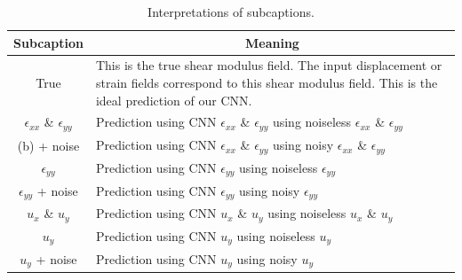 \documentclass[12pt]{article}
\begin{document}
\begin{table}
  \centering
   \begin{tabular}{cp{8cm}}
    \hline
    \multicolumn{1}{|c|}{Subcaption} & \multicolumn{1}{c|}{Meaning}\\
    \hline
    \multicolumn{1}{|c|}{True} & \multicolumn{1}{p{8cm}|}{This is the true shear modulus field. The input displacement or strain fields correspond to this shear modulus field. This is the ideal prediction of our CNN.}\\
    \hline
    \multicolumn{1}{|c|}{$\epsilon_{xx}$ \& $\epsilon_{yy}$} & \multicolumn{1}{p{8cm}|}{Prediction using CNN $\epsilon_{xx}$ \& $\epsilon_{yy}$ using noiseless $\epsilon_{xx}$ \& $\epsilon_{yy}$}\\
    \hline
    \multicolumn{1}{|c|}{(b) + noise} & \multicolumn{1}{p{8cm}|}{Prediction using CNN $\epsilon_{xx}$ \& $\epsilon_{yy}$ using noisy $\epsilon_{xx}$ \& $\epsilon_{yy}$}\\
    \hline
    \multicolumn{1}{|c|}{$\epsilon_{yy}$} & \multicolumn{1}{p{8cm}|}{Prediction using CNN $\epsilon_{yy}$ using noiseless $\epsilon_{yy}$}\\
    \hline
    \multicolumn{1}{|c|}{$\epsilon_{yy}$ + noise} & \multicolumn{1}{p{8cm}|}{Prediction using CNN $\epsilon_{yy}$ using noisy $\epsilon_{yy}$}\\
    \hline
    \multicolumn{1}{|c|}{$u_x$ \& $u_y$} & \multicolumn{1}{p{8cm}|}{Prediction using CNN $u_x$ \& $u_y$  using noiseless $u_x$ \& $u_y$ }\\
    \hline
    \multicolumn{1}{|c|}{$u_y$} & \multicolumn{1}{p{8cm}|}{Prediction using CNN $u_y$  using noiseless $u_y$ }\\
    \hline
    \multicolumn{1}{|c|}{$u_y$ + noise} & \multicolumn{1}{p{8cm}|}{Prediction using CNN $u_y$  using noisy $u_y$ }\\
    \hline
  \end{tabular}
  \caption{\label{tab:subcap} Interpretations of subcaptions.}
\end{table}
%
\end{document}
